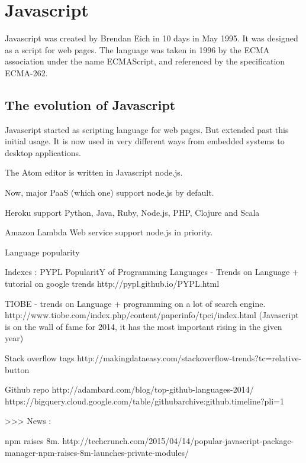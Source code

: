 \chapter{Javascript}

Javascript was created by Brendan Eich in 10 days in May 1995.
It was designed as a script for web pages.
The language was taken in 1996 by the ECMA association under the name ECMAScript, and referenced by the specification ECMA-262.


\section{The evolution of Javascript}

Javascript started as scripting language for web pages.
But extended past this initial usage.
It is now used in very different ways from embedded systems to desktop applications.



The Atom editor is written in Javascript node.js.



Now, major PaaS (which one) support node.js by default.

Heroku support Python, Java, Ruby, Node.js, PHP, Clojure and Scala

Amazon Lambda Web service support node.js in priority.



Language popularity

Indexes : 
PYPL PopularitY of Programming Languages - Trends on Language + tutorial on google trends
http://pypl.github.io/PYPL.html

TIOBE - trends on Language + programming on a lot of search engine.
http://www.tiobe.com/index.php/content/paperinfo/tpci/index.html
(Javascript is on the wall of fame for 2014, it has the most important rising in the given year)



Stack overflow tags
http://makingdataeasy.com/stackoverflow-trends?tc=relative-button


Github repo
http://adambard.com/blog/top-github-languages-2014/
https://bigquery.cloud.google.com/table/githubarchive:github.timeline?pli=1


>>> News :

npm raises 8m.
http://techcrunch.com/2015/04/14/popular-javascript-package-manager-npm-raises-8m-launches-private-modules/




